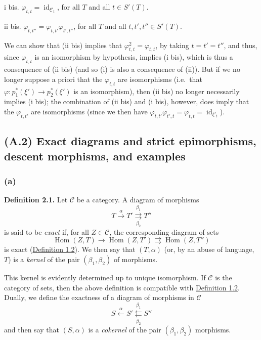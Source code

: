 \documentclass{article}
\newenvironment{rmenv}[1]
  {\phantomsection\par\smallskip\noindent\textbf{#1.}\rmfamily}
  {\par\smallskip}
\newcommand{\oldpage}[1]{\marginpar{\footnotesize$\Big\vert$ \textit{p.~#1}}}
\theoremstyle{definition}
\theoremstyle{definition}
\theoremstyle{definition}
\theoremstyle{definition}
\theoremstyle{remark}
\begin{document}
i bis. \oldpage{190-06}\(\varphi_{t,t}=\operatorname{id}_{\xi'_t}\), for all \(T\) and all \(t\in S'(T)\).

ii bis. \(\varphi_{t,t''}=\varphi_{t,t'}\varphi_{t',t''}\), for all \(T\) and all \(t,t',t''\in S'(T)\).

We can show that (ii bis) implies that \(\varphi_{t,t}^2=\varphi_{t,t}\), by taking \(t=t'=t''\), and thus, since \(\varphi_{t,t}\) is an isomorphism by hypothesis, implies (i bis), which is thus a consequence of (ii bis) (and so (i) is also a consequence of (ii)).
But if we no longer suppose a priori that the \(\varphi_{t,t}\) are isomorphisms (i.e.~that \(\varphi\colon p_1^*(\xi')\to p_2^*(\xi')\) is an isomorphism), then (ii bis) no longer necessarily implies (i bis);
the combination of (ii bis) and (i bis), however, does imply that the \(\varphi_{t,t'}\) are isomorphisms (since we then have \(\varphi_{t,t'}\varphi_{t',t}=\varphi_{t,t}=\operatorname{id}_{\xi'_t}\)).

\hypertarget{fga-3-i-section-A.2}{%
\subsection{(A.2) Exact diagrams and strict epimorphisms, descent morphisms, and examples}\label{fga-3-i-section-A.2}}

\hypertarget{fga-3-i-section-A.2.a}{%
\subsubsection{(a)}\label{fga-3-i-section-A.2.a}}

\leavevmode{}%
\begin{rmenv}{Definition 2.1}
Let \({\mathcal{C}}\) be a category.
A diagram of morphisms
\[
  T \xrightarrow{\alpha}
  T' \overset{\beta_1}{\underset{\beta_2}{\rightrightarrows}}
  T''
\]
is said to be \emph{exact} if, for all \(Z\in{\mathcal{C}}\), the corresponding diagram of sets
\[
  \operatorname{Hom}(Z,T) \to
  \operatorname{Hom}(Z,T') \rightrightarrows
  \operatorname{Hom}(Z,T'')
\]
is exact (\protect\hyperlink{fga-3-i-section-A.1-definition-1.2}{Definition 1.2}).
We then say that \((T,\alpha)\) (or, by an abuse of language, \(T\)) is a \emph{kernel} of the pair \((\beta_1,\beta_2)\) of morphisms.

\end{rmenv}

This kernel is evidently determined up to unique isomorphism.
If \({\mathcal{C}}\) is the category of sets, then the above definition is compatible with \protect\hyperlink{fga-3-i-section-A.1-definition-1.2}{Definition 1.2}.
Dually, we define the exactness of a diagram of morphisms in \({\mathcal{C}}\)
\[
  S \xleftarrow{\alpha}
  S' \overset{\beta_1}{\underset{\beta_2}{\leftleftarrows}}
  S''
\]
and then say that \((S,\alpha)\) is a \emph{cokernel} of the pair \((\beta_1,\beta_2)\) morphisms.
\end{document}
